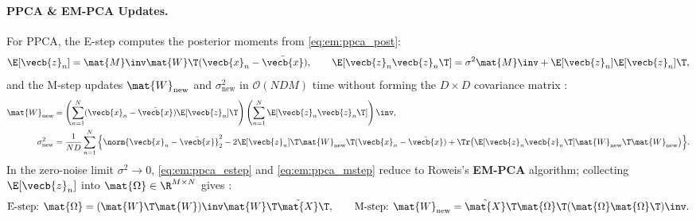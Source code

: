 \documentclass[../../../../master.tex]{subfiles}
\begin{document}
\paragraph{PPCA \& EM-PCA Updates.} For PPCA, the E-step computes the posterior moments from \eqref{eq:em:ppca_post}:
\begin{equation}
  \E[\vecb{z}_n] = \mat{M}\inv\mat{W}\T(\vecb{x}_n - \bar{\vecb{x}}), \qquad \E[\vecb{z}_n\vecb{z}_n\T] = \sigma^2\mat{M}\inv + \E[\vecb{z}_n]\E[\vecb{z}_n]\T,
  \label{eq:em:ppca_estep}
\end{equation}
and the M-step updates $\mat{W}_{\mathrm{new}}$ and $\sigma^2_{\mathrm{new}}$ in $\mathcal{O}(NDM)$ time without forming the $D\times D$ covariance matrix :
\begin{align}
  \mat{W}_{\mathrm{new}} &= \left(\sum_{n=1}^N (\vecb{x}_n - \bar{\vecb{x}})\E[\vecb{z}_n]\T\right)\left(\sum_{n=1}^N \E[\vecb{z}_n\vecb{z}_n\T]\right)\inv, \label{eq:em:ppca_mstep} \\
  \sigma^2_{\mathrm{new}} &= \frac{1}{ND}\sum_{n=1}^N \Big\{\norm{\vecb{x}_n - \bar{\vecb{x}}}_2^2 - 2\E[\vecb{z}_n]\T\mat{W}_{\mathrm{new}}\T(\vecb{x}_n - \bar{\vecb{x}}) + \Tr\big(\E[\vecb{z}_n\vecb{z}_n\T]\mat{W}_{\mathrm{new}}\T\mat{W}_{\mathrm{new}}\big)\Big\}. \nonumber
\end{align}
In the zero-noise limit $\sigma^2 \to 0$, \eqref{eq:em:ppca_estep} and \eqref{eq:em:ppca_mstep} reduce to Roweis's \textbf{EM-PCA} algorithm; collecting $\E[\vecb{z}_n]$ into $\mat{\Omega} \in \R^{M \times N}$ gives :
\begin{equation}
  \text{E-step: } \mat{\Omega} = (\mat{W}\T\mat{W})\inv\mat{W}\T\tilde{\mat{X}}\T, \qquad \text{M-step: } \mat{W}_{\mathrm{new}} = \tilde{\mat{X}}\T\mat{\Omega}\T(\mat{\Omega}\mat{\Omega}\T)\inv.
  \label{eq:em:empca}
\end{equation}
\end{document}
